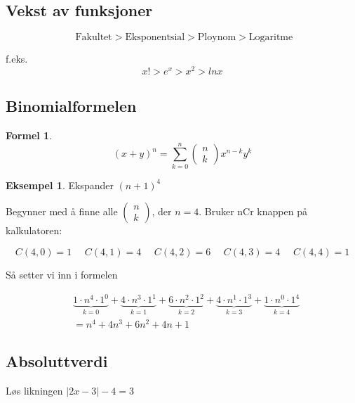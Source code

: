 \documentclass[11pt]{article}
\theoremstyle{definition}
\theoremstyle{definition}
\newtheorem{mitteks}{Eksempel}[section]
\theoremstyle{definition}
\theoremstyle{definition}
\theoremstyle{definition}
\theoremstyle{definition}
\newtheorem{formel}{Formel}
\newenvironment{fformel}
{\begin{mdframed}[style=minstil]\begin{formel}}
		{\end{formel}\end{mdframed}}
\begin{document}
	\newpage
    
    \subsection{Vekst av funksjoner}
    
    \[\text{{ Fakultet}}>\text{Eksponentsial}>\text{Ploynom}>\text{Logaritme}\]
    
    f.eks.
    \[ x!>e^x>x^2>lnx\]
    
    \newpage
    
    \subsection{Binomialformelen}
    
    \begin{fformel}
    	\[(x+y)^n=\sum_{k=0}^{n}\left( \begin{array}{cc}
    	n\\k
    	\end{array} \right)x^{n-k}y^k \]
    \end{fformel}
    
    \begin{mitteks}
    	Ekspander \((n+1)^4 \)
    	
    	Begynner med å finne alle \(\left( \begin{array}{cc}
    		n\\k
    	\end{array} \right)\), der \(n=4\). Bruker nCr knappen på kalkulatoren:
    	
    	\[C(4,0)=1 \hspace{16pt}C(4,1)=4 \hspace{16pt} C(4,2)=6\hspace{16pt} C(4,3)=4\hspace{16pt}C(4,4)=1\]
    		
    	Så setter vi inn i formelen
    	
    	\begin{align*}
    	&\underbrace{1\cdot n^4\cdot 1^0}_{k=0}+\underbrace{4\cdot n^3\cdot1^1}_{k=1}+\underbrace{6\cdot n^2 \cdot 1^2}_{k=2} + \underbrace{4\cdot n^1 \cdot 1^3}_{k=3}+
    	\underbrace{1\cdot n^0\cdot 1^4}_{k=4}\\
    	&=n^4+4n^3+6n^2+4n+1
    	\end{align*}
    \end{mitteks}
    \newpage
		
	\subsection{Absoluttverdi}	
		Løs likningen \(|2x-3|-4=3\)
		
\end{document}
